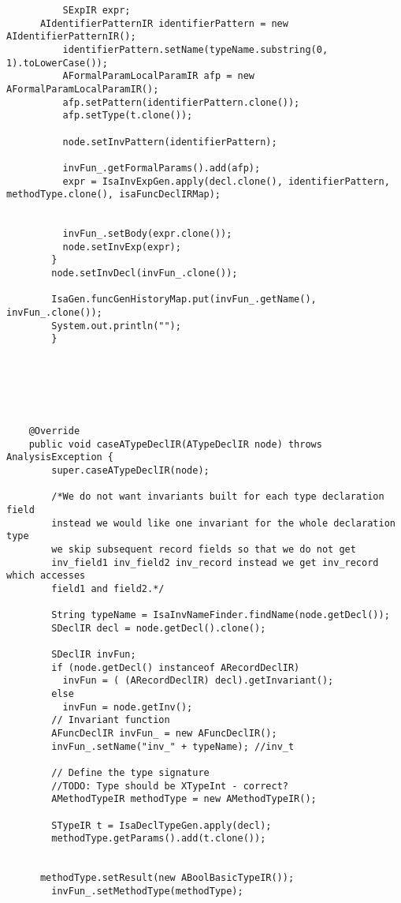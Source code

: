 \begin{appendices}
\begin{lstlisting}
          SExpIR expr;
      AIdentifierPatternIR identifierPattern = new AIdentifierPatternIR();
          identifierPattern.setName(typeName.substring(0, 1).toLowerCase());
          AFormalParamLocalParamIR afp = new AFormalParamLocalParamIR();
          afp.setPattern(identifierPattern.clone());
          afp.setType(t.clone()); 
          
          node.setInvPattern(identifierPattern);
          
          invFun_.getFormalParams().add(afp);
          expr = IsaInvExpGen.apply(decl.clone(), identifierPattern, methodType.clone(), isaFuncDeclIRMap);
          
          
          invFun_.setBody(expr.clone());
          node.setInvExp(expr);
        }
        node.setInvDecl(invFun_.clone());
        
        IsaGen.funcGenHistoryMap.put(invFun_.getName(), invFun_.clone());
        System.out.println("");
        }
        
    
    
    
    
  
    @Override
    public void caseATypeDeclIR(ATypeDeclIR node) throws AnalysisException {
        super.caseATypeDeclIR(node);
        
        /*We do not want invariants built for each type declaration field
        instead we would like one invariant for the whole declaration type
        we skip subsequent record fields so that we do not get
        inv_field1 inv_field2 inv_record instead we get inv_record which accesses
        field1 and field2.*/
        
        String typeName = IsaInvNameFinder.findName(node.getDecl());
        SDeclIR decl = node.getDecl().clone();
         
        SDeclIR invFun;
        if (node.getDecl() instanceof ARecordDeclIR)
          invFun = ( (ARecordDeclIR) decl).getInvariant();
        else
          invFun = node.getInv();
        // Invariant function
        AFuncDeclIR invFun_ = new AFuncDeclIR();
        invFun_.setName("inv_" + typeName); //inv_t

        // Define the type signature
        //TODO: Type should be XTypeInt - correct?
        AMethodTypeIR methodType = new AMethodTypeIR();
        
        STypeIR t = IsaDeclTypeGen.apply(decl);
        methodType.getParams().add(t.clone());
        
          
      methodType.setResult(new ABoolBasicTypeIR());
        invFun_.setMethodType(methodType);
         

\end{lstlisting}
\end{appendices}
